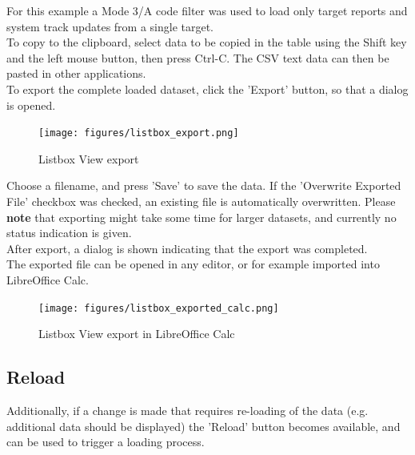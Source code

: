 For this example a Mode 3/A code filter was used to load only target reports and system track updates from a single target. \\

To copy to the clipboard, select data to be copied in the table using the Shift key and the left mouse button, then press Ctrl-C. The CSV text data can then be pasted in other applications. \\

To export the complete loaded dataset, click the 'Export' button, so that a dialog is opened.

\begin{figure}[H]
    \hspace*{-2cm}
    \texttt{[image: figures/listbox\_export.png]}
  \caption{Listbox View export}
\end{figure}

Choose a filename, and press 'Save' to save the data. If the 'Overwrite Exported File' checkbox was checked, an existing file is automatically overwritten. Please \textbf{note} that exporting might take some time for larger datasets, and currently no status indication is given.\\

After export, a dialog is shown indicating that the export was completed. \\

The exported file can be opened in any editor, or for example imported into LibreOffice Calc.

\begin{figure}[H]
    \hspace*{-2.5cm}
    \texttt{[image: figures/listbox\_exported\_calc.png]}
  \caption{Listbox View export in LibreOffice Calc}
\end{figure}
 
\subsection{Reload}

Additionally, if a change is made that requires re-loading of the data (e.g. additional data should be displayed) the 'Reload' button becomes available, and can be used to trigger a loading process. 
